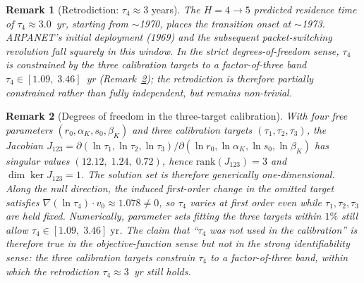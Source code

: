 \documentclass[11pt]{article}
\newtheorem{remark}{Remark}
\begin{document}
\begin{remark}[Retrodiction: $\tau_4\approx 3$ years]
\label{rmk:tau4_retrodiction}
The $H = 4 \to 5$ predicted residence time of $\tau_4 \approx 3.0$~yr, starting
from $\sim$1970, places the transition onset at $\sim$1973.
ARPANET's initial deployment (1969) and the subsequent
packet-switching revolution fall squarely in this window.
In the strict degrees-of-freedom sense, $\tau_4$ is constrained by the
three calibration targets to a factor-of-three band
$\tau_4 \in [1.09,\;3.46]$~yr (Remark~\ref{rmk:freedom_analysis});
the retrodiction is therefore partially constrained rather than fully
independent, but remains non-trivial.
\end{remark}

\begin{remark}[Degrees of freedom in the three-target calibration]
\label{rmk:freedom_analysis}
With four free parameters $(r_0,\alpha_K,s_0,\beta_K)$ and three
calibration targets $(\tau_1,\tau_2,\tau_3)$, the Jacobian
$J_{123}=\partial(\ln\tau_1,\ln\tau_2,\ln\tau_3)/\partial(\ln r_0,\ln\alpha_K,\ln s_0,\ln\beta_K)$
has singular values $(12.12,\;1.24,\;0.72)$, hence
$\mathrm{rank}(J_{123})=3$ and $\dim\ker J_{123}=1$.
The solution set is therefore generically one-dimensional.
Along the null direction, the induced first-order change in the
omitted target satisfies
$\nabla(\ln\tau_4)\cdot v_0 \approx 1.078 \neq 0$,
so $\tau_4$ varies at first order even while $\tau_1,\tau_2,\tau_3$
are held fixed.
Numerically, parameter sets fitting the three targets within $1\%$
still allow $\tau_4 \in [1.09,\;3.46]\;\mathrm{yr}$.
The claim that ``$\tau_4$ was not used in the calibration'' is
therefore true in the objective-function sense but not in the
strong identifiability sense: the three calibration targets constrain
$\tau_4$ to a factor-of-three band, within which the retrodiction
$\tau_4 \approx 3$~yr still holds.
\end{remark}

\end{document}

